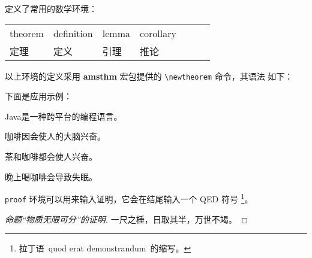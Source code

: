 \zzuthesis{} 定义了常用的数学环境：
\begin{center}
\begin{tabular}{*{7}{l}}\hline
  theorem & definition & lemma & corollary &\\
  定理 & 定义 & 引理 & 推论 &\\\hline
\end{tabular}
\end{center}

以上环境的定义采用 \textbf{amsthm} 宏包提供的 \verb|\newtheorem| 命令，其语法
如下：

\begin{latex}
\newtheorem{环境名}[编号延续]{显示名}[编号层次]
\end{latex}

下面是应用示例：
\begin{definition}
Java是一种跨平台的编程语言。
\end{definition}

\begin{theorem}
咖啡因会使人的大脑兴奋。
\end{theorem}

\begin{lemma}
茶和咖啡都会使人兴奋。
\end{lemma}

\begin{corollary}
晚上喝咖啡会导致失眠。
\end{corollary}

\texttt{proof} 环境可以用来输入证明，它会在结尾输入一个 QED 符号
\footnote{拉丁语~quod erat demonstrandum~的缩写。}。

\begin{proof}[命题“物质无限可分”的证明]
一尺之棰，日取其半，万世不竭。
\end{proof}